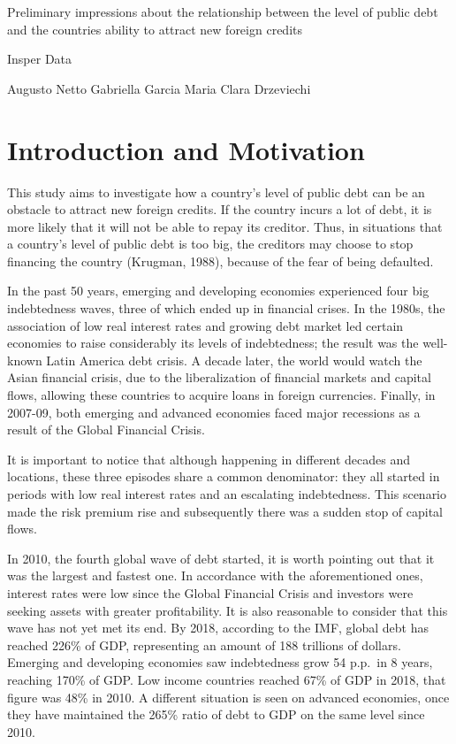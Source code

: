 \documentclass[]{article}
\author{}
\date{\vspace{-2.5em}}
\begin{document}
{
\setcounter{tocdepth}{2}
\tableofcontents
}
Preliminary impressions about the relationship between the level of
public debt and the countries ability to attract new foreign credits

Insper Data

Augusto Netto Gabriella Garcia Maria Clara Drzeviechi

\section{Introduction and Motivation}\label{introduction-and-motivation}

This study aims to investigate how a country's level of public debt can
be an obstacle to attract new foreign credits. If the country incurs a
lot of debt, it is more likely that it will not be able to repay its
creditor. Thus, in situations that a country's level of public debt is
too big, the creditors may choose to stop financing the country
(Krugman, 1988), because of the fear of being defaulted.

In the past 50 years, emerging and developing economies experienced four
big indebtedness waves, three of which ended up in financial crises. In
the 1980s, the association of low real interest rates and growing debt
market led certain economies to raise considerably its levels of
indebtedness; the result was the well-known Latin America debt crisis. A
decade later, the world would watch the Asian financial crisis, due to
the liberalization of financial markets and capital flows, allowing
these countries to acquire loans in foreign currencies. Finally, in
2007-09, both emerging and advanced economies faced major recessions as
a result of the Global Financial Crisis.

It is important to notice that although happening in different decades
and locations, these three episodes share a common denominator: they all
started in periods with low real interest rates and an escalating
indebtedness. This scenario made the risk premium rise and subsequently
there was a sudden stop of capital flows.

In 2010, the fourth global wave of debt started, it is worth pointing
out that it was the largest and fastest one. In accordance with the
aforementioned ones, interest rates were low since the Global Financial
Crisis and investors were seeking assets with greater profitability. It
is also reasonable to consider that this wave has not yet met its end.
By 2018, according to the IMF, global debt has reached 226\% of GDP,
representing an amount of 188 trillions of dollars. Emerging and
developing economies saw indebtedness grow 54 p.p.~in 8 years, reaching
170\% of GDP. Low income countries reached 67\% of GDP in 2018, that
figure was 48\% in 2010. A different situation is seen on advanced
economies, once they have maintained the 265\% ratio of debt to GDP on
the same level since 2010.
\end{document}
